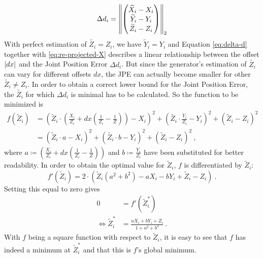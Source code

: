 \begin{equation}
\label{eq:delta-d}
	\Delta d_i = \norm{ 
	\begin{pmatrix}
		\widetilde{X}_i - X_i \\
		\widetilde{Y}_i - Y_i \\
		\widetilde{Z}_i - Z_i
	\end{pmatrix}
	}_2
\end{equation}
With perfect estimation of $\widetilde{Z_i} = Z_i$, we have $\widetilde{Y}_i = Y_i$ and Equation \eqref{eq:delta-d} together with \eqref{eq:re-projected-X} describes a linear relationship between the offset $\abs{dx}$ and the Joint Position Error $\Delta d_i$.
But since the generator's estimation of $\widetilde{Z_i}$ can vary for different offsets $dx$, the JPE can actually become smaller for other $\widetilde{Z_i} \neq Z_i$. 
In order to obtain a correct lower bound for the Joint Position Error, the $\widetilde{Z_i}$ for which $\Delta d_i$ is minimal has to be calculated.
So the function to be minimized is
\begin{align}
	\label{eq:minimum-distance}
	f(\widetilde{Z}_i) &= \left ( \widetilde{Z}_i \cdot \left( \frac{X_i}{Z_i} + dx \left( \frac{1}{Z_i} - \frac{1}{Z} \right) \right ) - X_i \right)^2 + \left ( \widetilde{Z_i} \cdot \frac{Y_i}{Z_i} - Y_i \right )^2 + \left ( \widetilde{Z}_i - Z_i \right ) ^2 \\
	&= \left ( \widetilde{Z}_i \cdot a - X_i \right)^2 + \left ( \widetilde{Z_i} \cdot b - Y_i \right )^2 + \left ( \widetilde{Z}_i - Z_i \right )^2 \ ,
\end{align}
where $a \coloneqq \left( \frac{X_i}{Z_i} + dx \left( \frac{1}{Z_i} - \frac{1}{Z} \right) \right )$ and $b \coloneqq \frac{Y_i}{Z_i}$ have been substituted for better readability.
In order to obtain the optimal value for $\widetilde{Z}_i$, $f$ is differentiated by $\widetilde{Z}_i$:
\begin{equation}
	\label{eq:derivative-minimum-distance}
	f'(\widetilde{Z}_i) = 2 \cdot \left ( \widetilde{Z}_i \left (a^2 + b^2 \right ) - a X_i - b Y_i + \widetilde{Z}_i - Z_i \right ) \ .
\end{equation}
Setting this equal to zero gives
\begin{align}
	0 &= f'(\widetilde{Z}_i^\ast) \\
	\Leftrightarrow \widetilde{Z}_i^\ast & = \frac{a X_i + b Y_i + Z_i}{1 + a^2 + b^2} \ .
	\label{eq:z_i-min}
\end{align}
With $f$ being a square function with respect to $\widetilde{Z}_i$, it is easy to see that $f$ has indeed a minimum at $\widetilde{Z}_i^\ast$ and that this is $f$'s global minimum.
